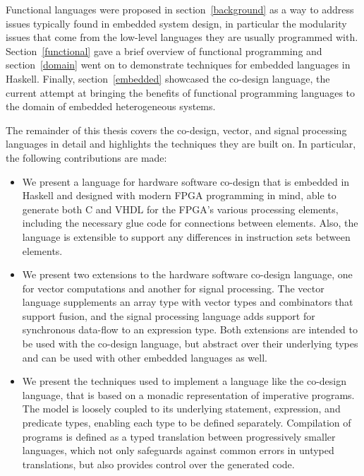 \documentclass[../paper.tex]{subfiles}
\begin{document}
Functional languages were proposed in section~\ref{background} as a way to address issues typically found in embedded system design, in particular the modularity issues that come from the low-level languages they are usually programmed with. Section~\ref{functional} gave a brief overview of functional programming and section~\ref{domain} went on to demonstrate techniques for embedded languages in Haskell. Finally, section~\ref{embedded} showcased the co-design language, the current attempt at bringing the benefits of functional programming languages to the domain of embedded heterogeneous systems.

The remainder of this thesis covers the co-design, vector, and signal processing languages in detail and highlights the techniques they are built on. In particular, the following contributions are made:

\begin{itemize}
\item We present a language for hardware software co-design that is embedded in Haskell and designed with modern FPGA programming in mind, able to generate both C and VHDL for the FPGA's various processing elements, including the necessary glue code for connections between elements. Also, the language is extensible to support any differences in instruction sets between elements.

\item We present two extensions to the hardware software co-design language, one for vector computations and another for signal processing. The vector language supplements an array type with vector types and combinators that support fusion, and the signal processing language adds support for synchronous data-flow to an expression type. Both extensions are intended to be used with the co-design language, but abstract over their underlying types and can be used with other embedded languages as well.

\item We present the techniques used to implement a language like the co-design language, that is based on a monadic representation of imperative programs. The model is loosely coupled to its underlying statement, expression, and predicate types, enabling each type to be defined separately. Compilation of programs is defined as a typed translation between progressively smaller languages, which not only safeguards against common errors in untyped translations, but also provides control over the generated code.

\end{itemize}
\end{document}
